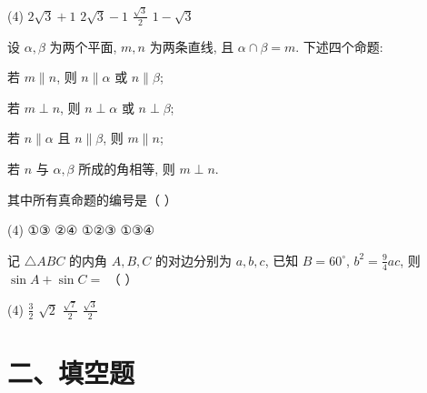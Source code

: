 \documentclass[UTF8,12pt]{ctexart}
\begin{document}
\begin{questions}
    \begin{tasks}(4)
      \task $2\sqrt{3}+1$
      \task $2\sqrt{3}-1$
      \task $\frac{\sqrt{3}}{2}$
      \task $1-\sqrt{3}$
    \end{tasks}

  \item 设 $\alpha, \beta$ 为两个平面, $m, n$ 为两条直线, 且 $\alpha \cap \beta = m$.
    下述四个命题:

    \begin{statements}
      \item[①] 若 $m \parallel n$, 则 $n \parallel \alpha$ 或 $n \parallel \beta$;
      \item[②] 若 $m \perp n$, 则 $n \perp \alpha$ 或 $n \perp \beta$;
      \item[③] 若 $n \parallel \alpha$ 且 $n \parallel \beta$, 则 $m \parallel n$;
      \item[④] 若 $n$ 与 $\alpha, \beta$ 所成的角相等, 则 $m \perp n$.
    \end{statements}

  其中所有真命题的编号是（ ）

    \begin{tasks}(4)
      \task ①③
      \task ②④
      \task ①②③
      \task ①③④
    \end{tasks}

  \item 记 $\triangle ABC$ 的内角 $A, B, C$ 的对边分别为 $a, b, c$, 已知
    $B = 60^{\circ}$, $b^{2} = \frac{9}{4}ac$, 则 $\sin A + \sin C =$ （ ）

    \begin{tasks}(4)
      \task $\frac{3}{2}$
      \task $\sqrt{2}$
      \task $\frac{\sqrt{7}}{2}$
      \task $\frac{\sqrt{3}}{2}$
    \end{tasks}

\end{questions}

\section*{二、填空题}
\end{document}
